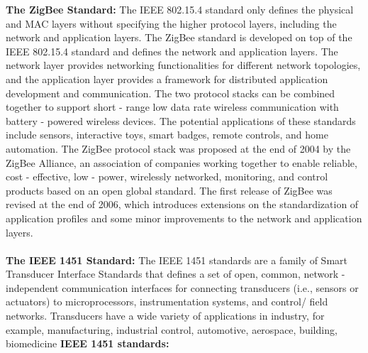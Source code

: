 \textbf{The ZigBee Standard:} The IEEE 802.15.4 standard only defines the physical and MAC layers without specifying the higher protocol layers, including the network and application layers. The ZigBee standard is developed on top of the IEEE 802.15.4 standard and defines the network and application layers. The network layer provides networking functionalities for different network topologies, and the application layer provides a framework for distributed application development and communication. The two protocol stacks can be combined together to support short - range low data rate wireless communication with battery - powered wireless devices. The potential applications of these standards include sensors, interactive toys, smart badges, remote controls, and home automation. The ZigBee protocol stack was proposed at the end of 2004 by the ZigBee Alliance, an association of companies working together to enable reliable, cost - effective, low - power, wirelessly networked, monitoring, and control products based on an open global standard. The first release of ZigBee was revised at the end of 2006, which introduces extensions on the standardization of application profiles and some minor improvements to the network and application layers.\\\\
\textbf{The IEEE 1451 Standard:} The IEEE 1451 standards are a family of Smart Transducer Interface Standards that defines a set of open, common, network - independent communication interfaces for connecting transducers (i.e., sensors or actuators) to microprocessors, instrumentation systems, and control/ field networks. Transducers have a wide variety of applications in industry, for example, manufacturing, industrial control, automotive, aerospace, building, biomedicine
\textbf{IEEE 1451 standards:}
